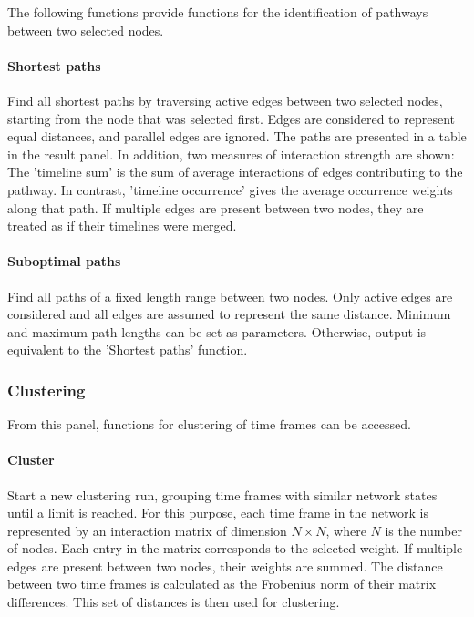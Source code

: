 The following functions provide functions for the identification of pathways between two selected nodes.

\paragraph{Shortest paths} Find all shortest paths by traversing active edges between two selected nodes, starting from the node that was selected first. Edges are considered to represent equal distances, and parallel edges are ignored. The paths are presented in a table in the result panel. In addition, two measures of interaction strength are shown: The 'timeline sum' is the sum of average interactions of edges contributing to the pathway. In contrast, 'timeline occurrence' gives the average occurrence weights along that path. If multiple edges are present between two nodes, they are treated as if their timelines were merged.

\paragraph{Suboptimal paths} Find all paths of a fixed length range between two nodes. Only active edges are considered and all edges are assumed to represent the same distance. Minimum and maximum path lengths can be set as parameters. Otherwise, output is equivalent to the 'Shortest paths' function.

\subsubsection{Clustering}

From this panel, functions for clustering of time frames can be accessed.

\paragraph{Cluster} Start a new clustering run, grouping time frames with similar network states until a limit is reached. For this purpose, each time frame in the network is represented by an interaction matrix of dimension $N \times N$, where $N$ is the number of nodes. Each entry in the matrix corresponds to the selected weight. If multiple edges are present between two nodes, their weights are summed. The distance between two time frames is calculated as the Frobenius norm of their matrix differences. This set of distances is then used for clustering.


